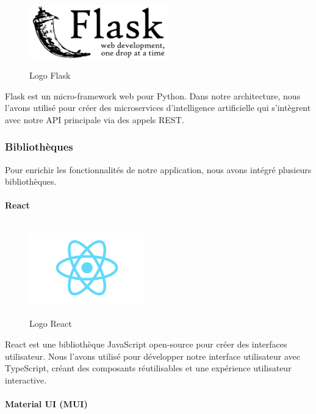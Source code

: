 \begin{figure}[H]
    \centering
    \includegraphics[width=6cm, height=3cm]{images/flask.png}
    \caption{Logo Flask}
\end{figure}

\noindent Flask est un micro-framework web pour Python. Dans notre architecture, nous l'avons utilisé pour créer des microservices d'intelligence artificielle qui s'intègrent avec notre API principale via des appels REST.

\subsubsection{Bibliothèques}

\noindent Pour enrichir les fonctionnalités de notre application, nous avons intégré plusieurs bibliothèques.

\paragraph{React}

\begin{figure}[H]
    \centering
    \includegraphics[width=5cm, height=4cm]{images/react.png}
    \caption{Logo React}
\end{figure}

\noindent React est une bibliothèque JavaScript open-source pour créer des interfaces utilisateur. Nous l'avons utilisé pour développer notre interface utilisateur avec TypeScript, créant des composants réutilisables et une expérience utilisateur interactive.

\paragraph{Material UI (MUI)}

